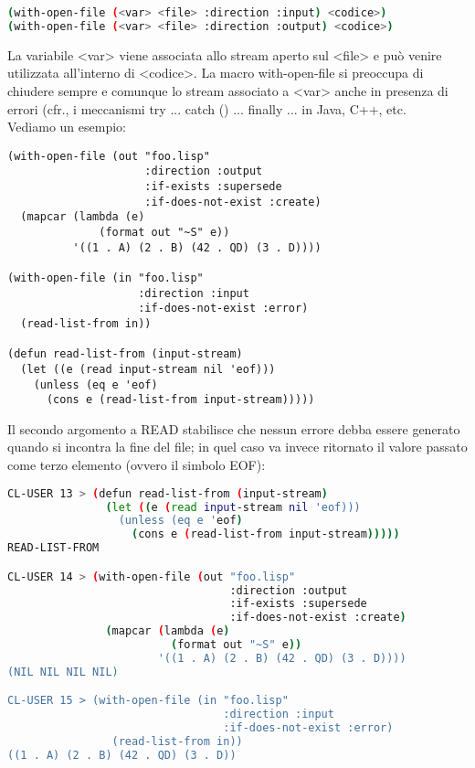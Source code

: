 \documentclass[a4paper,12pt, oneside]{book}
\begin{document}
\begin{shaded}
\begin{lstlisting}[language=bash]
(with-open-file (<var> <file> :direction :input) <codice>)
(with-open-file (<var> <file> :direction :output) <codice>)
\end{lstlisting}
\end{shaded}
La variabile <var> viene associata allo stream aperto sul <file> e può venire
utilizzata all'interno di <codice>. La macro with-open-file si preoccupa di chiudere sempre e comunque lo
stream associato a <var> anche in presenza di errori (cfr., i meccanismi try
{...} catch () {...} finally {...} in Java, C++, etc. \\
Vediamo un esempio:
\begin{verbatim}
(with-open-file (out "foo.lisp"
                     :direction :output
                     :if-exists :supersede
                     :if-does-not-exist :create)
  (mapcar (lambda (e)
              (format out "~S" e))
          '((1 . A) (2 . B) (42 . QD) (3 . D))))
          
(with-open-file (in "foo.lisp"
                    :direction :input
                    :if-does-not-exist :error)
  (read-list-from in))
  
(defun read-list-from (input-stream)
  (let ((e (read input-stream nil 'eof)))
    (unless (eq e 'eof)
      (cons e (read-list-from input-stream)))))
\end{verbatim}
Il secondo argomento a READ stabilisce che nessun errore debba essere generato quando
si incontra la fine del file; in quel caso va invece ritornato il valore passato come terzo
elemento (ovvero il simbolo EOF):
\begin{shaded}
\begin{lstlisting}[language=bash]
CL-USER 13 > (defun read-list-from (input-stream)
               (let ((e (read input-stream nil 'eof)))
                 (unless (eq e 'eof)
                   (cons e (read-list-from input-stream)))))
READ-LIST-FROM

CL-USER 14 > (with-open-file (out "foo.lisp"
                                  :direction :output
                                  :if-exists :supersede
                                  :if-does-not-exist :create)
               (mapcar (lambda (e)
                         (format out "~S" e))
                       '((1 . A) (2 . B) (42 . QD) (3 . D))))
(NIL NIL NIL NIL)

CL-USER 15 > (with-open-file (in "foo.lisp"
                                 :direction :input
                                 :if-does-not-exist :error)
                (read-list-from in))
((1 . A) (2 . B) (42 . QD) (3 . D))
\end{lstlisting}
\end{shaded}
\end{document}
